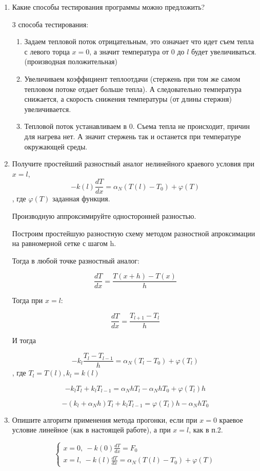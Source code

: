 \documentclass[a4paper,14pt]{extreport} %
\begin{document}
\begin{enumerate}
\item Какие способы тестирования программы можно предложить?

3 способа тестирования: 
\begin{enumerate}
\item Задаем тепловой поток отрицательным, это означает что идет съем тепла с левого торца $x=0$, а значит температура от 0 до $l$ будет увеличиваться. (производная положительная)
\item Увеличиваем коэффициент теплоотдачи (стержень при том же самом тепловом потоке отдает больше тепла). А следовательно температура снижается, а скорость снижения температуры (от длины стержня) увеличивается. 
\item Тепловой поток устанавливаем в 0. Съема тепла не происходит, причин для нагрева нет. А значит стержень так и останется при температуре окружающей среды. 
\end{enumerate}

\item Получите  простейший разностный аналог нелинейного краевого условия при  $x=l$, $$-k(l)\frac{dT}{dx}=\alpha_N(T(l)-T_0)+\varphi(T)$$,
где $\varphi(T)$ заданная функция.

Производную аппроксимируйте односторонней разностью.

Построим простейшую разностную схему методом разностной апроксимации на равномерной сетке с шагом h. 

Тогда в любой точке разностный аналог:

$$\frac{dT}{dx}=\frac{T(x+h)-T(x)}{h}$$

Тогда при $x=l$:

$$\frac{dT}{dx}=\frac{T_{l+1}-T_l}{h}$$

И тогда

$$-k_l\frac{T_{l}-T_{l-1}}{h}=\alpha_N(T_l-T_0)+\varphi(T_l)$$, где $T_l=T(l), k_l=k(l)$

$$-k_lT_{l}+k_lT_{l-1}=\alpha_NhT_l-\alpha_NhT_0+\varphi(T_l)h$$

$$-(k_l+\alpha_Nh)T_{l}+k_lT_{l-1}=\varphi(T_l)h-\alpha_NhT_0$$

\item Опишите алгоритм применения метода прогонки, если при $x=0$ краевое условие линейное (как в настоящей работе), а при $x=l$, как в п.2.

$$
 \begin{cases}
   x=0, ~-k(0)\frac{dT}{dx}=F_0
   \\
   x =l,~-k(l)\frac{dT}{dx}=\alpha_N(T(l)-T_0) + \varphi(T)
 \end{cases}
$$


\end{enumerate}
\end{document}

